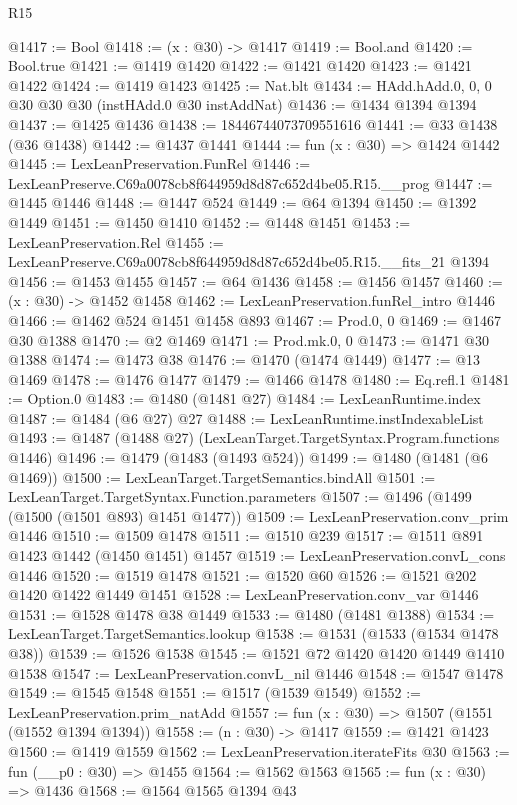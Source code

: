 \begin{lexlean}{R15}
\begin{coremodule}
@1417 := Bool
@1418 := (x : @30) -> @1417
@1419 := Bool.and
@1420 := Bool.true
@1421 := @1419 @1420
@1422 := @1421 @1420
@1423 := @1421 @1422
@1424 := @1419 @1423
@1425 := Nat.blt
@1434 := HAdd.hAdd.{0, 0, 0} @30 @30 @30 (instHAdd.{0} @30 instAddNat)
@1436 := @1434 @1394 @1394
@1437 := @1425 @1436
@1438 := 18446744073709551616
@1441 := @33 @1438 (@36 @1438)
@1442 := @1437 @1441
@1444 := fun (x : @30) => @1424 @1442
@1445 := LexLeanPreservation.FunRel
@1446 := LexLeanPreserve.C69a0078cb8f644959d8d87c652d4be05.R15.__prog
@1447 := @1445 @1446
@1448 := @1447 @524
@1449 := @64 @1394
@1450 := @1392 @1449
@1451 := @1450 @1410
@1452 := @1448 @1451
@1453 := LexLeanPreservation.Rel
@1455 := LexLeanPreserve.C69a0078cb8f644959d8d87c652d4be05.R15.__fits_21 @1394
@1456 := @1453 @1455
@1457 := @64 @1436
@1458 := @1456 @1457
@1460 := (x : @30) -> @1452 @1458
@1462 := LexLeanPreservation.funRel_intro @1446
@1466 := @1462 @524 @1451 @1458 @893
@1467 := Prod.{0, 0}
@1469 := @1467 @30 @1388
@1470 := @2 @1469
@1471 := Prod.mk.{0, 0}
@1473 := @1471 @30 @1388
@1474 := @1473 @38
@1476 := @1470 (@1474 @1449)
@1477 := @13 @1469
@1478 := @1476 @1477
@1479 := @1466 @1478
@1480 := Eq.refl.{1}
@1481 := Option.{0}
@1483 := @1480 (@1481 @27)
@1484 := LexLeanRuntime.index
@1487 := @1484 (@6 @27) @27
@1488 := LexLeanRuntime.instIndexableList
@1493 := @1487 (@1488 @27) (LexLeanTarget.TargetSyntax.Program.functions @1446)
@1496 := @1479 (@1483 (@1493 @524))
@1499 := @1480 (@1481 (@6 @1469))
@1500 := LexLeanTarget.TargetSemantics.bindAll
@1501 := LexLeanTarget.TargetSyntax.Function.parameters
@1507 := @1496 (@1499 (@1500 (@1501 @893) @1451 @1477))
@1509 := LexLeanPreservation.conv_prim @1446
@1510 := @1509 @1478
@1511 := @1510 @239
@1517 := @1511 @891 @1423 @1442 (@1450 @1451) @1457
@1519 := LexLeanPreservation.convL_cons @1446
@1520 := @1519 @1478
@1521 := @1520 @60
@1526 := @1521 @202 @1420 @1422 @1449 @1451
@1528 := LexLeanPreservation.conv_var @1446
@1531 := @1528 @1478 @38 @1449
@1533 := @1480 (@1481 @1388)
@1534 := LexLeanTarget.TargetSemantics.lookup
@1538 := @1531 (@1533 (@1534 @1478 @38))
@1539 := @1526 @1538
@1545 := @1521 @72 @1420 @1420 @1449 @1410 @1538
@1547 := LexLeanPreservation.convL_nil @1446
@1548 := @1547 @1478
@1549 := @1545 @1548
@1551 := @1517 (@1539 @1549)
@1552 := LexLeanPreservation.prim_natAdd
@1557 := fun (x : @30) => @1507 (@1551 (@1552 @1394 @1394))
@1558 := (n : @30) -> @1417
@1559 := @1421 @1423
@1560 := @1419 @1559
@1562 := LexLeanPreservation.iterateFits @30
@1563 := fun (__p0 : @30) => @1455
@1564 := @1562 @1563
@1565 := fun (x : @30) => @1436
@1568 := @1564 @1565 @1394 @43

\end{coremodule}
\end{lexlean}
